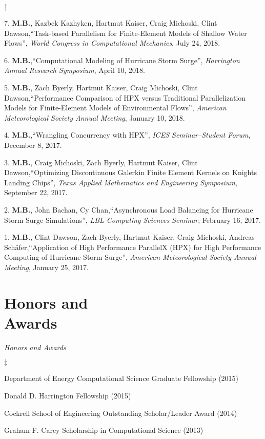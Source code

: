 \documentclass[margin,line]{res}
\newenvironment{list2}{
  \begin{list}{$\ddagger$}{%
      \setlength{\itemsep}{0in}
      \setlength{\parsep}{0in} \setlength{\parskip}{0in}
      \setlength{\topsep}{0in} \setlength{\partopsep}{0in}
      \setlength{\leftmargin}{0.2in}}}{\end{list}}
\newcommand{\talk}[4]{%
#1,``#2'', {\it #3}, #4.%
}
\begin{document}
\begin{resume}
\begin{list2}
\item[7.] \talk{{\bf M.B.}, Kazbek Kazhyken, Hartmut Kaiser, Craig Michoski, Clint Dawson}{Task-based Parallelism for Finite-Element Models of Shallow Water Flows}{World Congress in Computational Mechanics}{July 24, 2018}

\item[6.] \talk{{\bf M.B.}}{Computational Modeling of Hurricane Storm Surge}{Harrington Annual Research Symposium}{April 10, 2018}

\item[5.] \talk{{\bf M.B.}, Zach Byerly, Hartmut Kaiser, Craig Michoski, Clint Dawson}{Performance Comparison of HPX versus Traditional Parallelization Models for Finite-Element Models of Environmental Flows}{American Meteorological Society Annual Meeting}{January 10, 2018}

\item[4.] \talk{{\bf M.B.}}{Wrangling Concurrency with HPX}{ICES Seminar--Student Forum}{December 8, 2017}

\item[3.] \talk{{\bf M.B.}, Craig Michoski, Zach Byerly, Hartmut Kaiser, Clint Dawson}{Optimizing Discontinuous Galerkin Finite Element Kernels on Knights Landing Chips}{Texas Applied Mathematics and Engineering Symposium}{September 22, 2017}

\item[2.] \talk{{\bf M.B.}, John Bachan, Cy Chan}{Asynchronous Load Balancing for Hurricane Storm Surge Simulations}{LBL Computing Sciences Seminar}{February 16, 2017}

\item[1.] \talk{{\bf M.B.}, Clint Dawson, Zach Byerly, Hartmut Kaiser, Craig Michoski, Andreas Sch\"afer}{Application of High Performance ParallelX (HPX) for High Performance Computing of Hurricane Storm Surge}{American Meteorological Society Annual Meeting}{January 25, 2017}
\end{list2}

\section{\sc Honors and \\ Awards}

\textit{Honors and Awards}
\vspace{0.05in}
\begin{list2}
\item[] Department of Energy Computational Science Graduate Fellowship (2015)
\item[] Donald D. Harrington Fellowship (2015)
\item[] Cockrell School of Engineering Outstanding Scholar/Leader Award (2014)
\item[] Graham F. Carey Scholarship in Computational Science (2013)
\end{list2}



\end{resume}
\end{document}
